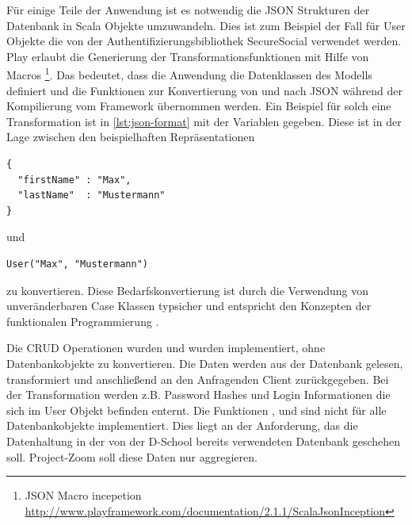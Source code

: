 Für einige Teile der Anwendung ist es notwendig die JSON Strukturen der Datenbank in Scala Objekte umzuwandeln. Dies ist zum Beispiel der Fall für User Objekte die von der Authentifizierungsbibliothek SecureSocial verwendet werden. Play erlaubt die Generierung der Transformationsfunktionen mit Hilfe von Macros \footnote{JSON Macro incepetion \url{http://www.playframework.com/documentation/2.1.1/ScalaJsonInception}}. Das bedeutet, dass die Anwendung die Datenklassen des Modells definiert und die Funktionen zur Konvertierung von und nach JSON während der Kompilierung vom Framework übernommen werden. Ein Beispiel für solch eine Transformation ist in \ref{lst:json-format} mit der Variablen  gegeben. Diese ist in der Lage zwischen den beispielhaften Repräsentationen 
\begin{lstlisting} 
{ 
  "firstName" : "Max", 
  "lastName"  : "Mustermann" 
}
\end{lstlisting} und 
\begin{lstlisting} 
User("Max", "Mustermann")
\end{lstlisting} 
zu konvertieren. Diese Bedarfskonvertierung ist durch die Verwendung von unveränderbaren Case Klassen typsicher und entspricht den Konzepten der funktionalen Programmierung \cite{functional-thinking}.

Die CRUD Operationen wurden  und  wurden implementiert, ohne Datenbankobjekte zu konvertieren. Die Daten werden aus der Datenbank gelesen, transformiert und anschließend an den Anfragenden Client zurückgegeben. Bei der Transformation werden z.B. Password Hashes und Login Informationen die sich im User Objekt befinden enternt. Die Funktionen ,  und  sind nicht für alle Datenbankobjekte implementiert. Dies liegt an der Anforderung, das die Datenhaltung in der von der D-School bereits verwendeten Datenbank geschehen soll. Project-Zoom soll diese Daten nur aggregieren.
